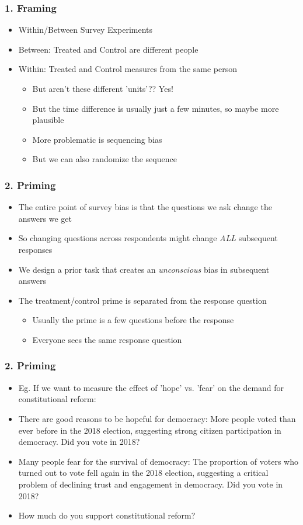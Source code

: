 \documentclass[xcolor=x11names,compress]{beamer}\usepackage[]{graphicx}\usepackage[]{color}
\renewcommand{\(}{\begin{columns}}
\renewcommand{\)}{\end{columns}}
\newcommand{\<}[1]{\begin{column}{#1}}
\renewcommand{\>}{\end{column}}
\begin{document}
\begin{frame}
\frametitle{1. Framing}
\begin{itemize}
\item Within/Between Survey Experiments
\pause
\item Between: Treated and Control are different people
\pause
\item Within: Treated and Control measures from the same person
\begin{itemize}
\item But aren't these different 'units'?? \pause Yes!
\pause
\item But the time difference is usually just a few minutes, so maybe more plausible
\pause
\item More problematic is sequencing bias
\pause
\item But we can also randomize the sequence
\end{itemize}
\end{itemize}
\end{frame}

\begin{frame}
\frametitle{2. Priming}
\begin{itemize}
\item The entire point of survey bias is that the questions we ask change the answers we get
\pause
\item So changing questions across respondents might change \textit{ALL} subsequent responses
\pause
\item We design a prior task that creates an \textit{unconscious} bias in subsequent answers
\pause
\item The treatment/control prime is separated from the response question
\pause
\begin{itemize}
\item Usually the prime is a few questions before the response
\pause
\item Everyone sees the same response question
\end{itemize}
\end{itemize}
\end{frame}

\begin{frame}
\frametitle{2. Priming}
\begin{itemize}
\item Eg. If we want to measure the effect of 'hope' vs. 'fear' on the demand for constitutional reform:
\pause
\item There are good reasons to be hopeful for democracy: More people voted than ever before in the 2018 election, suggesting strong citizen participation in democracy. Did you vote in 2018?
\pause
\item Many people fear for the survival of democracy: The proportion of voters who turned out to vote fell again in the 2018 election, suggesting a critical problem of declining trust and engagement in democracy. Did you vote in 2018?
\pause
\item How much do you support constitutional reform?
\end{itemize}
\end{frame}
\end{document}
